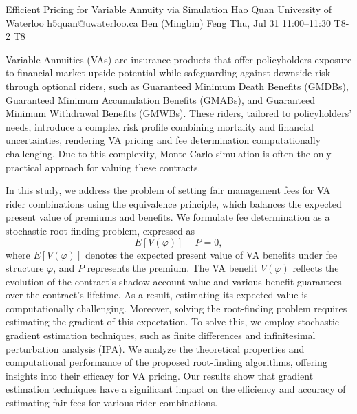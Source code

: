 \begin{talk}
\end{talk}

\begin{talk}
  {Efficient Pricing for Variable Annuity via Simulation}%
  {Hao Quan}%
  {University of Waterloo}%
  {h5quan@uwaterloo.ca}%
  {Ben (Mingbin) Feng}%
  {}%
  {Thu, Jul 31 11:00--11:30}%
  {T8-2}%
  {T8}%
  
    

Variable Annuities (VAs) are insurance products that offer policyholders exposure to financial market upside potential while safeguarding against downside risk through optional riders, such as Guaranteed Minimum Death Benefits (GMDBs), Guaranteed Minimum Accumulation Benefits (GMABs), and Guaranteed Minimum Withdrawal Benefits (GMWBs). These riders, tailored to policyholders’ needs, introduce a complex risk profile combining mortality and financial uncertainties, rendering VA pricing and fee determination computationally challenging. Due to this complexity, Monte Carlo simulation is often the only practical approach for valuing these contracts.

In this study, we address the problem of setting fair management fees for VA rider combinations using the equivalence principle, which balances the expected present value of premiums and benefits. We formulate fee determination as a stochastic root-finding problem, expressed as
\[
E[V(\varphi)] - P = 0,
\]
where \( E[V(\varphi)] \) denotes the expected present value of VA benefits under fee structure \( \varphi \), and \( P \) represents the premium. The VA benefit \( V(\varphi) \) reflects the evolution of the contract’s shadow account value and various benefit guarantees over the contract’s lifetime. As a result, estimating its expected value is computationally challenging. Moreover, solving the root-finding problem requires estimating the gradient of this expectation. To solve this, we employ stochastic gradient estimation techniques, such as finite differences and infinitesimal perturbation analysis (IPA). We analyze the theoretical properties and computational performance of the proposed root-finding algorithms, offering insights into their efficacy for VA pricing. Our results show that gradient estimation techniques have a significant impact on the efficiency and accuracy of estimating fair fees for various rider combinations.
\end{talk}

